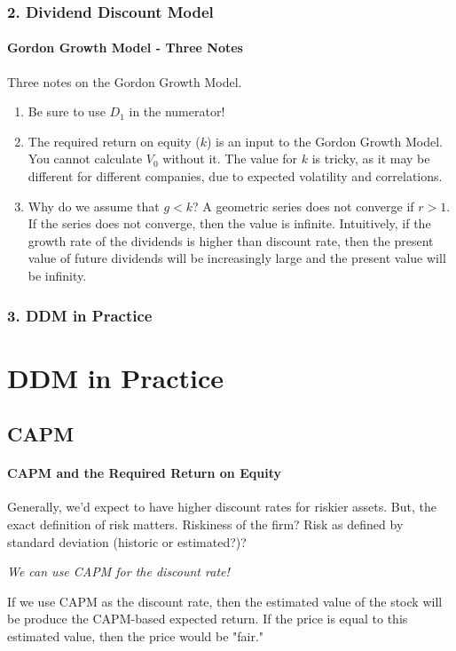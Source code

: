 \documentclass{beamer}
\begin{document}
\begin{frame}[t]
    \frametitle{2. Dividend Discount Model}
    \framesubtitle{Gordon Growth Model - Three Notes}

    Three notes on the Gordon Growth Model.
    \begin{enumerate}
        \item Be sure to use $D_1$ in the numerator!
        \item The required return on equity ($k$) is an input to the Gordon Growth Model.   
        You cannot calculate $V_0$ without it.   
        The value for $k$ is tricky, as it may be different for different companies, 
        due to expected volatility and correlations.   
        \item Why do we assume that $g<k$?  A geometric series does not converge if $r>1$.   
        If the series does not converge, then the value is infinite.   
        Intuitively, if the growth rate of the dividends is higher than discount rate, 
        then the present value of future dividends will be 
        increasingly large and the present value will be infinity.  
    \end{enumerate}

\end{frame}

\begin{frame}[t]
    \frametitle{3. DDM in Practice}
    \section{DDM in Practice}
    \subsection{CAPM}
    \framesubtitle{CAPM and the Required Return on Equity}

    Generally, we'd expect to have higher discount rates for riskier assets. But, the exact definition of risk matters. Riskiness of the firm?   Risk as defined by standard deviation (historic or estimated?)?\\
    \vspace{1em}

    \textit{We can use CAPM for the discount rate!}
    \vspace{1em}
    
    If we use CAPM as the discount rate, then the 
    estimated value of the stock will be produce the CAPM-based expected return.   If the price is equal to this estimated value, 
    then the price would be "fair."\\
    \vspace{1em}


\end{frame}
\end{document}
